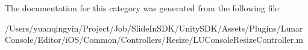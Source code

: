 The documentation for this category was generated from the following file\+:\begin{DoxyCompactItemize}
\item 
/\+Users/yuanqingyin/\+Project/\+Job/\+Slide\+In\+S\+D\+K/\+Unity\+S\+D\+K/\+Assets/\+Plugins/\+Lunar\+Console/\+Editor/i\+O\+S/\+Common/\+Controllers/\+Resize/L\+U\+Console\+Resize\+Controller.\+m\end{DoxyCompactItemize}

